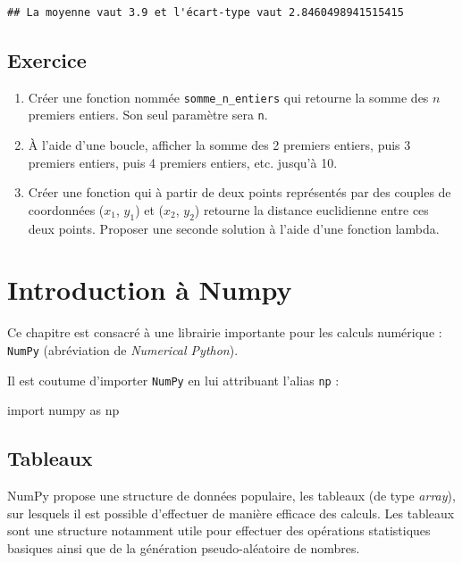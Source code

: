\documentclass[
  12pt,
]{book}
\makeatletter
\newenvironment{Shaded}{\begin{snugshade}}{\end{snugshade}}
\newcommand{\ImportTok}[1]{#1}
\newcommand{\NormalTok}[1]{#1}
\providecommand{\tightlist}{%
  \setlength{\itemsep}{0pt}\setlength{\parskip}{0pt}}
\numberwithin{equation}{section}
\numberwithin{countremarque}{section}
\newenvironment{exframe}{%
 \def\at@end@of@exframe{}%
 \ifinner\ifhmode%
  \def\at@end@of@exframe{\end{minipage}}%
  \begin{minipage}{\columnwidth}%
 \fi\fi%
 \def\FrameCommand##1{\hskip\@totalleftmargin \hskip-\fboxsep
 \colorbox{shadecolorex}{##1}\hskip-\fboxsep
     \hskip-\linewidth \hskip-\@totalleftmargin \hskip\columnwidth}%
 \MakeFramed {\advance\hsize-\width
   \@totalleftmargin\z@ \linewidth\hsize
   \@setminipage}}%
 {\par\unskip\endMakeFramed%
 \at@end@of@exframe}
\makeatother
\begin{document}
\begin{lstlisting}
## La moyenne vaut 3.9 et l'écart-type vaut 2.8460498941515415
\end{lstlisting}

\section{Exercice}\label{exercice-6}

\begin{exframe}
\begin{enumerate}
\def\labelenumi{\arabic{enumi}.}
\tightlist
\item
  Créer une fonction nommée \texttt{somme\_n\_entiers} qui retourne la somme des \(n\) premiers entiers. Son seul paramètre sera \texttt{n}.
\item
  À l'aide d'une boucle, afficher la somme des 2 premiers entiers, puis 3 premiers entiers, puis 4 premiers entiers, etc. jusqu'à 10.
\item
  Créer une fonction qui à partir de deux points représentés par des couples de coordonnées (\(x_1\), \(y_1\)) et (\(x_2\), \(y_2\)) retourne la distance euclidienne entre ces deux points. Proposer une seconde solution à l'aide d'une fonction lambda.
\end{enumerate}
\end{exframe}

\chapter{Introduction à Numpy}\label{numpy}

Ce chapitre est consacré à une librairie importante pour les calculs numérique : \texttt{NumPy} (abréviation de \emph{Numerical Python}).

Il est coutume d'importer \texttt{NumPy} en lui attribuant l'alias \texttt{np} :

\begin{Shaded}
\begin{Highlighting}[]
\ImportTok{import}\NormalTok{ numpy }\ImportTok{as}\NormalTok{ np}
\end{Highlighting}
\end{Shaded}

\section{Tableaux}\label{numpy-tableaux}

NumPy propose une structure de données populaire, les tableaux (de type \emph{array}), sur lesquels il est possible d'effectuer de manière efficace des calculs. Les tableaux sont une structure notamment utile pour effectuer des opérations statistiques basiques ainsi que de la génération pseudo-aléatoire de nombres.
\end{document}
